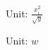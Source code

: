 \documentclass{ctexart}
\begin{document}
Unit: $ \frac{x^{2}_{i}}{\sqrt{y}}$

Unit: $ w$
\end{document}
